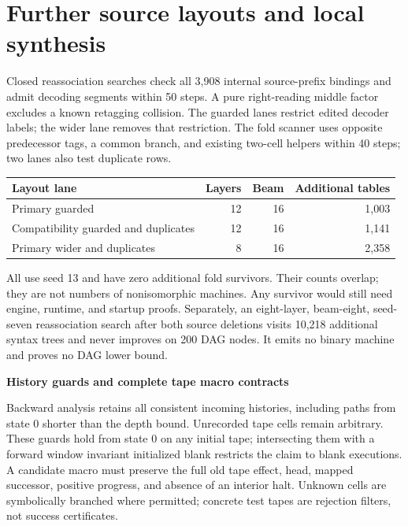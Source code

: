 \documentclass[11pt,letterpaper]{article}
\begin{document}
\clearpage
\section{Further source layouts and local synthesis}
Closed reassociation searches check all 3,908 internal source-prefix bindings
and admit decoding segments within 50 steps. A pure right-reading middle
factor excludes a known retagging collision. The guarded lanes restrict edited
decoder labels; the wider lane removes that restriction. The fold scanner
uses opposite predecessor tags, a common branch, and existing two-cell helpers
within 40 steps; two lanes also test duplicate rows.
\begin{center}\small\begin{tabular}{lrrr}\toprule
Layout lane & Layers & Beam & Additional tables\\\midrule
Primary guarded & 12 & 16 & 1,003\\
Compatibility guarded and duplicates & 12 & 16 & 1,141\\
Primary wider and duplicates & 8 & 16 & 2,358\\\bottomrule
\end{tabular}\end{center}
All use seed 13 and have zero additional fold survivors. Their counts overlap;
they are not numbers of nonisomorphic machines. Any survivor would still need
engine, runtime, and startup proofs. Separately, an eight-layer, beam-eight,
seed-seven reassociation search after both source deletions visits 10,218
additional syntax trees and never improves on 200 DAG nodes. It emits no
binary machine and proves no DAG lower bound.

\medskip\noindent\textbf{History guards and complete tape macro contracts}\par
Backward analysis retains all consistent incoming histories, including paths
from state 0 shorter than the depth bound. Unrecorded tape cells remain
arbitrary. These guards hold from state 0 on any initial tape; intersecting
them with a forward window invariant initialized blank restricts the claim to
blank executions. A candidate macro must preserve the full old tape effect,
head, mapped successor, positive progress, and absence of an interior halt.
Unknown cells are symbolically branched where permitted; concrete test tapes
are rejection filters, not success certificates.
\end{document}
